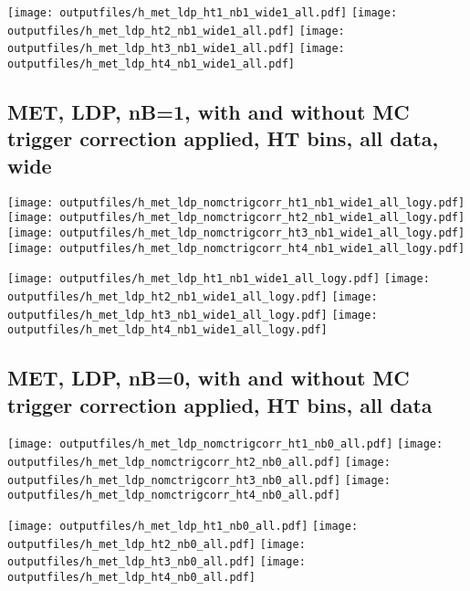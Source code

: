 \documentclass[11pt]{article}
\begin{document}
    \noindent
     \texttt{[image: outputfiles/h\_met\_ldp\_ht1\_nb1\_wide1\_all.pdf]}
     \texttt{[image: outputfiles/h\_met\_ldp\_ht2\_nb1\_wide1\_all.pdf]}
     \texttt{[image: outputfiles/h\_met\_ldp\_ht3\_nb1\_wide1\_all.pdf]}
     \texttt{[image: outputfiles/h\_met\_ldp\_ht4\_nb1\_wide1\_all.pdf]}

    \clearpage
     \subsection{ MET, LDP, nB=1, with and without MC trigger correction applied, HT bins, all data, wide}

    \noindent
     \texttt{[image: outputfiles/h\_met\_ldp\_nomctrigcorr\_ht1\_nb1\_wide1\_all\_logy.pdf]}
     \texttt{[image: outputfiles/h\_met\_ldp\_nomctrigcorr\_ht2\_nb1\_wide1\_all\_logy.pdf]}
     \texttt{[image: outputfiles/h\_met\_ldp\_nomctrigcorr\_ht3\_nb1\_wide1\_all\_logy.pdf]}
     \texttt{[image: outputfiles/h\_met\_ldp\_nomctrigcorr\_ht4\_nb1\_wide1\_all\_logy.pdf]}

    \noindent
     \texttt{[image: outputfiles/h\_met\_ldp\_ht1\_nb1\_wide1\_all\_logy.pdf]}
     \texttt{[image: outputfiles/h\_met\_ldp\_ht2\_nb1\_wide1\_all\_logy.pdf]}
     \texttt{[image: outputfiles/h\_met\_ldp\_ht3\_nb1\_wide1\_all\_logy.pdf]}
     \texttt{[image: outputfiles/h\_met\_ldp\_ht4\_nb1\_wide1\_all\_logy.pdf]}


    \clearpage
     \subsection{ MET, LDP, nB=0, with and without MC trigger correction applied, HT bins, all data}

    \noindent
     \texttt{[image: outputfiles/h\_met\_ldp\_nomctrigcorr\_ht1\_nb0\_all.pdf]}
     \texttt{[image: outputfiles/h\_met\_ldp\_nomctrigcorr\_ht2\_nb0\_all.pdf]}
     \texttt{[image: outputfiles/h\_met\_ldp\_nomctrigcorr\_ht3\_nb0\_all.pdf]}
     \texttt{[image: outputfiles/h\_met\_ldp\_nomctrigcorr\_ht4\_nb0\_all.pdf]}

    \noindent
     \texttt{[image: outputfiles/h\_met\_ldp\_ht1\_nb0\_all.pdf]}
     \texttt{[image: outputfiles/h\_met\_ldp\_ht2\_nb0\_all.pdf]}
     \texttt{[image: outputfiles/h\_met\_ldp\_ht3\_nb0\_all.pdf]}
     \texttt{[image: outputfiles/h\_met\_ldp\_ht4\_nb0\_all.pdf]}
\end{document}
